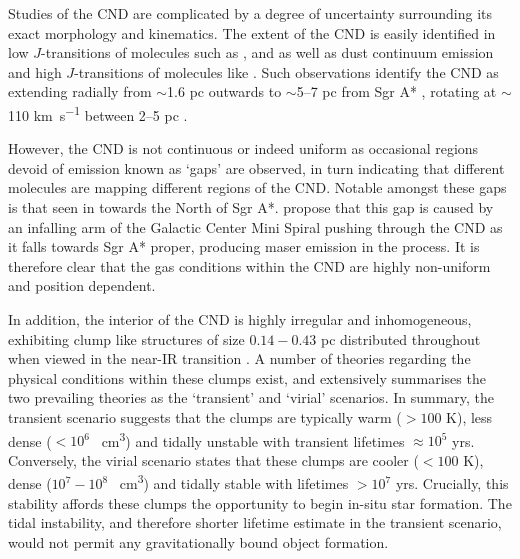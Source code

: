 \documentclass[twocolumn]{aastex631}
\begin{document}
Studies of the CND are complicated by a degree of uncertainty surrounding its exact morphology and kinematics. The extent of the CND is easily identified in low $J$-transitions of molecules such as ,  and  \citep{sgrAChemistry,tsuboiCNR} as well as dust continuum emission \citep{Lau_2013} and high $J$-transitions of molecules like  \citep{sgrACRIRLL}. Such observations identify the CND as extending radially from $\sim$1.6 pc outwards to $\sim$5--7 pc from Sgr A* \citep{Smith2014TheSignatures}, rotating at $\sim$110 \si{\kilo\meter\per\second} between 2--5 pc \citep{ghezStellarOrbits,Genzel2010}. 

However, the CND is not continuous or indeed uniform as occasional regions devoid of emission known as `gaps' are observed, in turn indicating that different molecules are mapping different regions of the CND. Notable amongst these gaps is that seen in  towards the North of Sgr A*. \citet{sgrANorthernGap} propose that this gap is caused by an infalling arm of the Galactic Center Mini Spiral pushing through the CND as it falls towards Sgr A* proper, producing  maser emission \citep{sgrAOHMaser} in the process. It is therefore clear that the gas conditions within the CND are highly non-uniform and position dependent.

In addition, the interior of the CND is highly irregular and inhomogeneous, exhibiting clump like structures of size $0.14 - 0.43$ \si{pc} distributed throughout when viewed in the near-IR  transition \citep{sgrACNDClumpHCN,sgrACNDClumpNeut,Christopher2005}. A number of theories regarding the physical conditions within these clumps exist, and \citet{Genzel2010} extensively summarises the two prevailing theories as the `transient' and `virial' scenarios. In summary, the transient scenario suggests that the clumps are typically warm ($> 100$ \si{K}), less dense ($< 10^{6}$ \si{\per\centi\meter\cubed}) and tidally unstable with transient lifetimes $\approx 10^{5}$ \si{yrs}. Conversely, the virial scenario states that these clumps are cooler ($< 100$ \si{K}), dense ($10^{7} - 10^{8}$ \si{\per\centi\meter\cubed}) and tidally stable with lifetimes $> 10^{7}$ \si{yrs}. Crucially, this stability affords these clumps the opportunity to begin in-situ star formation. The tidal instability, and therefore shorter lifetime estimate in the transient scenario, would not permit any gravitationally bound object formation. 
\end{document}
